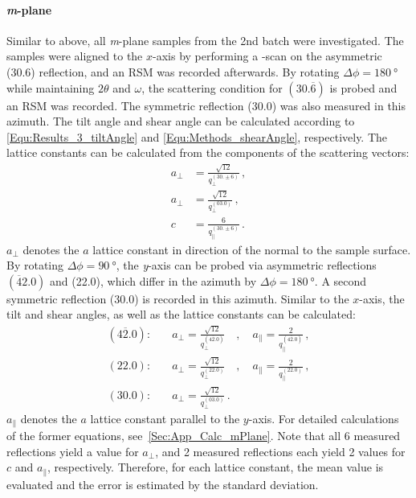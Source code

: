 \paragraph{\textit{m}-plane}
    Similar to above, all \textit{m}-plane samples from the 2nd batch were investigated.
    The samples were aligned to the $x$-axis by performing a \textphi-scan on the asymmetric (30.6) reflection, and an \gls{RSM} was recorded afterwards.
    By rotating $\Delta\phi=\qty{180}{\degree}$ while maintaining $2\theta$ and $\omega$, the scattering condition for $(30.\overline{6})$ is probed and an \gls{RSM} was recorded.
    The symmetric reflection (30.0) was also measured in this azimuth.
    The tilt angle and shear angle can be calculated according to \eqref{Equ:Results_3_tiltAngle} and \eqref{Equ:Methods_shearAngle}, respectively.
    The lattice constants can be calculated from the components of the scattering vectors:
    \begin{align}
        a_\perp &= \frac{\sqrt{12}}{q_\perp^{(30.\pm6)}} \,,\\
        a_\perp &= \frac{\sqrt{12}}{q_\perp^{(03.0)}}\,,\\
        c &= \frac{6}{q_\parallel^{(30.\pm6)}} \,.
    \end{align}
    $a_\perp$ denotes the $a$ lattice constant in direction of the normal to the sample surface.
    By rotating $\Delta\phi=\qty{90}{\degree}$, the \textit{y}-axis can be probed via asymmetric reflections $(\overline{4}2.0)$ and (22.0), which differ in the azimuth by $\Delta\phi=\qty{180}{\degree}$.
    A second symmetric reflection (30.0) is recorded in this azimuth.
    Similar to the $x$-axis, the tilt and shear angles, as well as the lattice constants can be calculated:
    \begin{align}
        (4\overline{2}.0):&\quad
            a_\perp = \frac{\sqrt{12}}{q_\perp^{(4\overline{2}.0)}}
            \quad,\quad
            a_\parallel = \frac{2}{q_\parallel^{(4\overline{2}.0)}}\,,\\
        (22.0):&\quad
            a_\perp = \frac{\sqrt{12}}{q_\perp^{(22.0)}}
            \quad,\quad
            a_\parallel = \frac{2}{q_\parallel^{(22.0)}}\,,\\
        (30.0):&\quad
            a_\perp = \frac{\sqrt{12}}{q_\perp^{(03.0)}}\,.
    \end{align}
    $a_\parallel$ denotes the $a$ lattice constant parallel to the $y$-axis.
    For detailed calculations of the former equations, see\ \ref{Sec:App_Calc_mPlane}.
    Note that all 6 measured reflections yield a value for $a_\perp$, and 2 measured reflections each yield 2 values for $c$ and $a_\parallel$, respectively.
    Therefore, for each lattice constant, the mean value is evaluated and the error is estimated by the standard deviation.
